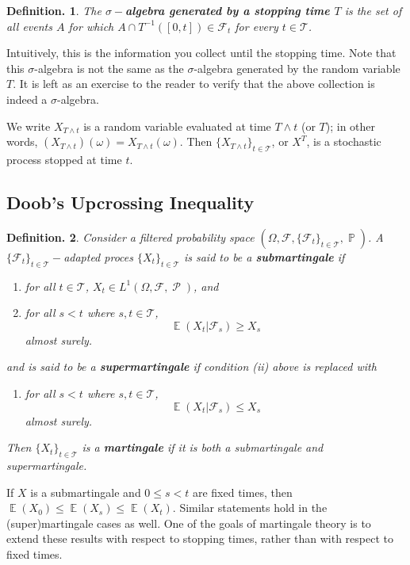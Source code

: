 \documentclass[11pt, a4paper]{memoir}
\theoremstyle{change}
\theoremstyle{plain}
\theoremstyle{nonumberplain}
\newtheorem{definition}{Definition.}
\DeclareMathOperator{\ps}{{\mathcal{P}}}
\DeclareMathOperator{\pr}{{\mathbb{P}}}
\DeclareMathOperator{\E}{{\mathbb{E}}}
\newcommand{\defn}[1]{{\boldmath\bfseries #1}}
\numberwithin{equation}{section}
\begin{document}
\begin{definition}
    The \defn{$\sigma-$algebra generated by a stopping time $T$} is the set of all events $A$ for which $A\cap T^{-1}([0,t])\in\mathcal{F}_t$ for every $t\in \mathcal{T}$.
\end{definition}
Intuitively, this is the information you collect until the stopping time.
Note that this $\sigma$-algebra is not the same as the $\sigma$-algebra generated by the random variable $T$.
It is left as an exercise to the reader to verify that the above collection is indeed a $\sigma$-algebra.

We write $X_{T\wedge t}$ is a random variable evaluated at time $T\wedge t$ (or $T$); in other words, $(X_{T\wedge t})(\omega)=X_{T\wedge t}(\omega)$.
Then $\{X_{T\wedge t}\}_{t\in\mathcal{T}}$, or $X^T$, is a stochastic process stopped at time $t$.
\subsection{Doob's Upcrossing Inequality}
\begin{definition}
    Consider a filtered probability space $(\Omega,\mathcal{F},\{\mathcal{F}_t\}_{t\in\mathcal{T}},\pr)$.
    A $\{\mathcal{F}_t\}_{t\in \mathcal{T}}-$adapted proces $\{X_t\}_{t\in \mathcal{T}}$ is said to be a \defn{submartingale} if
    \begin{enumerate}[nl,r]
        \item for all $t\in \mathcal{T}$, $X_t\in L^1(\Omega,\mathcal{F},\ps)$, and
        \item for all $s<t$ where $s,t\in \mathcal{T}$,
            \begin{equation*}
                \E(X_t | \mathcal{F}_s)\geq X_s
            \end{equation*}
            almost surely.
    \end{enumerate}
    and is said to be a \defn{supermartingale} if condition (ii) above is replaced with
    \begin{enumerate}[nl,r]
        \item[(ii')] for all $s<t$ where $s,t\in \mathcal{T}$,
            \begin{equation*}
                \E(X_t | \mathcal{F}_s)\leq X_s
            \end{equation*}
            almost surely.
    \end{enumerate}
    Then $\{X_t\}_{t\in \mathcal{T}}$ is a \defn{martingale} if it is both a submartingale and supermartingale.
\end{definition}
If $X$ is a submartingale and $0\leq s<t$ are fixed times, then $\E(X_0)\leq \E(X_s)\leq \E(X_t)$.
Similar statements hold in the (super)martingale cases as well.
One of the goals of martingale theory is to extend these results with respect to stopping times, rather than with respect to fixed times.
\end{document}
